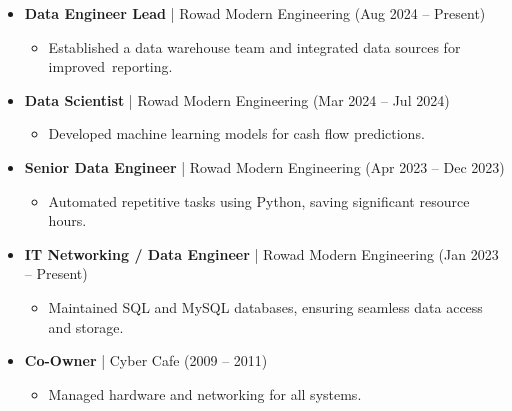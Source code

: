 \documentclass[10pt, letterpaper]{article}
\begin{document}
\begin{itemize}[leftmargin=*]
    \item \textbf{Data Engineer Lead} | Rowad Modern Engineering (Aug 2024 – Present)
    \begin{itemize}[leftmargin=1cm]
        \item Established a data warehouse team and integrated data sources for \mbox{improved reporting}.
    \end{itemize}
    \item \textbf{Data Scientist} | Rowad Modern Engineering (Mar 2024 – Jul 2024)
    \begin{itemize}[leftmargin=1cm]
        \item Developed machine learning models for cash flow predictions.
    \end{itemize}
    \item \textbf{Senior Data Engineer} | Rowad Modern Engineering (Apr 2023 – Dec 2023)
    \begin{itemize}[leftmargin=1cm]
        \item Automated repetitive tasks using Python, saving significant resource hours.
    \end{itemize}
    \item \textbf{IT Networking / Data Engineer} | Rowad Modern Engineering (Jan 2023 – Present)
    \begin{itemize}[leftmargin=1cm]
        \item Maintained SQL and MySQL databases, ensuring seamless data access and storage.
    \end{itemize}
    \item \textbf{Co-Owner} | Cyber Cafe (2009 – 2011)
    \begin{itemize}[leftmargin=1cm]
        \item Managed hardware and networking for all systems.
    \end{itemize}
\end{itemize}
\end{document}
